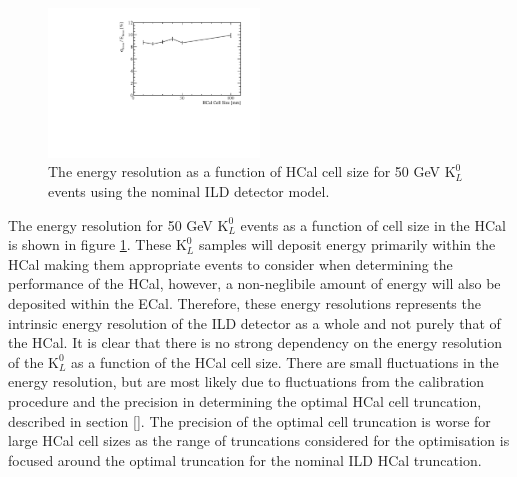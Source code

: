 \begin{figure}
\centering
\includegraphics[width=0.5\textwidth]{OptimisationStudies/Plots/EnergyResolution/ER_vs_HCalCellSize_50GeVKaon0L.pdf}
\caption[The energy resolution as a function of HCal cell size for 50 GeV $\text{K}^{0}_{L}$ events using the nominal ILD detector model.]{The energy resolution as a function of HCal cell size for 50 GeV $\text{K}^{0}_{L}$ events using the nominal ILD detector model.}
\label{fig:hcalcellser}
\end{figure}

The energy resolution for 50 GeV $\text{K}^{0}_{L}$ events as a function of cell size in the HCal is shown in figure \ref{fig:hcalcellser}.  These $\text{K}^{0}_{L}$ samples will deposit energy primarily within the HCal making them appropriate events to consider when determining the performance of the HCal, however, a non-neglibile amount of energy will also be deposited within the ECal.  Therefore, these energy resolutions represents the intrinsic energy resolution of the ILD detector as a whole and not purely that of the HCal.  It is clear that there is no strong dependency on the energy resolution of the $\text{K}^{0}_{L}$ as a function of the HCal cell size.  There are small fluctuations in the energy resolution, but are most likely due to fluctuations from the calibration procedure and the precision in determining the optimal HCal cell truncation, described in section \ref{}.  The precision of the optimal cell truncation is worse for large HCal cell sizes as the range of truncations considered for the optimisation is focused around the optimal truncation for the nominal ILD HCal truncation.  

